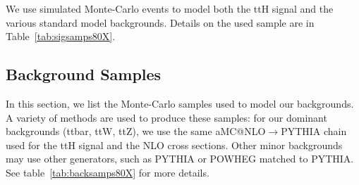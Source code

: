 
We use simulated Monte-Carlo events to model both the ttH signal and the various standard model backgrounds. 
Details on the used sample are in 
Table~\ref{tab:sigsamps80X}.

\begin{table}[h]
\footnotesize
\centering
{}
\caption{Signal samples used in this analysis (CMSSW 80X).}
\label{tab:sigsamps80X}
\end{table}

\subsection{Background Samples}


In this section, we list the Monte-Carlo samples used to model our backgrounds. A variety of methods are used to produce
these samples: for our dominant backgrounds (ttbar, ttW, ttZ), we use the same aMC@NLO$\to$PYTHIA chain 
used for the ttH signal and the NLO cross sections. Other minor backgrounds may use other generators, such as PYTHIA or POWHEG matched to PYTHIA. 
See table~\ref{tab:backsamps80X} for more details. \\

